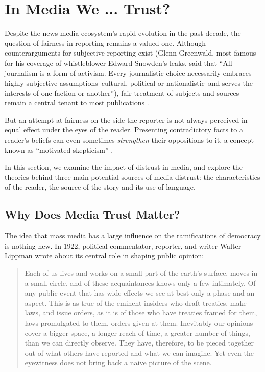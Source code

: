 \chapter{In Media We ... Trust?}

Despite the news media ecosystem's rapid evolution in the past decade, the question of fairness in reporting remains a valued one. Although counterarguments for subjective reporting exist (Glenn Greenwald, most famous for his coverage of whistleblower Edward Snowden's leaks, said that ``All journalism is a form of activism. Every journalistic choice necessarily embraces highly subjective assumptions--cultural, political or nationalistic--and serves the interests of one faction or another''), fair treatment of subjects and sources remain a central tenant to most publications \cite{Greenwald}. 
  
But an attempt at fairness on the side the reporter is not always perceived in equal effect under the eyes of the reader. Presenting contradictory facts to a reader's beliefs can even sometimes \emph{strengthen} their oppositions to it, a concept known as ``motivated skepticism'' \cite{taber2006motivated}.

In this section, we examine the impact of distrust in media, and explore the theories behind three main potential sources of media distrust: the characteristics of the reader, the source of the story and its use of language.


  
\section{Why Does Media Trust Matter?} 
 
 The idea that mass media has a large influence on the ramifications of democracy is nothing new. In 1922, political commentator, reporter, and writer Walter Lippman wrote about its central role in shaping public opinion:

     \begin{quote}Each of us lives and works on a small part of the earth's surface, moves in a small circle, and of these acquaintances knows only a few intimately. Of any public event that has wide effects we see at best only a phase and an aspect. This is as true of the eminent insiders who draft treaties, make laws, and issue orders, as it is of those who have treaties framed for them, laws promulgated to them, orders given at them. Inevitably our opinions cover a bigger space, a longer reach of time, a greater number of things, than we can directly observe. They have, therefore, to be pieced together out of what others have reported and what we can imagine.
    Yet even the eyewitness does not bring back a naive picture of the scene. 
    \cite{lippman1922public} 
    \end{quote} 

